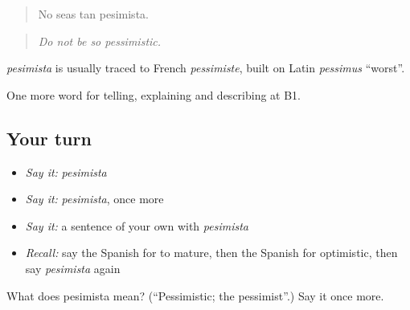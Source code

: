 \begin{quote}
No seas tan pesimista.
\end{quote}

\begin{quote}
\emph{Do not be so pessimistic.}
\end{quote}

\begin{cousinweb}
\emph{pesimista} is usually traced to French \emph{pessimiste}, built on Latin \emph{pessimus} \textquotedblleft{}worst\textquotedblright{}.
\end{cousinweb}

\begin{grammarlens}[title={What you've built}]
One more word for telling, explaining and describing at B1.
\end{grammarlens}

\subsection*{Your turn}
\begin{itemize}
\raggedright
  \item \emph{Say it:} \emph{pesimista}
  \item \emph{Say it:} \emph{pesimista}, once more
  \item \emph{Say it:} a sentence of your own with \emph{pesimista}
  \item \emph{Recall:} say the Spanish for to mature, then the Spanish for optimistic, then say \emph{pesimista} again
\end{itemize}

\begin{tcolorbox}[breakable,colback=teal!4,colframe=teal!35!black,title={Before you move on}]
What does pesimista mean? (\textquotedblleft{}Pessimistic; the pessimist\textquotedblright{}.) Say it once more.
\end{tcolorbox}
